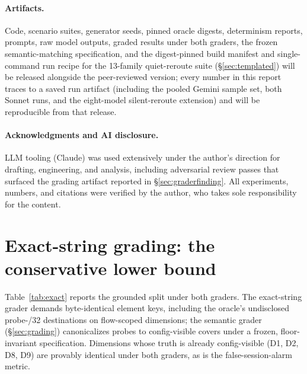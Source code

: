 \documentclass[11pt]{article}
\begin{document}
\paragraph{Artifacts.} Code, scenario suites, generator seeds, pinned
oracle digests, determinism reports, prompts, raw model outputs, graded
results under both graders, the frozen semantic-matching specification, and
the digest-pinned build manifest and single-command run recipe for the
13-family quiet-reroute suite (\S\ref{sec:templated})
will be released alongside the peer-reviewed version; every number in this
report traces to a saved run artifact (including the pooled Gemini sample
set, both Sonnet runs, and the eight-model silent-reroute extension) and will
be reproducible from that release.

\paragraph{Acknowledgments and AI disclosure.} LLM tooling (Claude) was
used extensively under the author's direction for drafting, engineering,
and analysis, including adversarial review passes that surfaced the grading
artifact reported in \S\ref{sec:graderfinding}. All experiments, numbers,
and citations were verified by the author, who takes sole responsibility
for the content.

\appendix

\section{Exact-string grading: the conservative lower bound}
\label{app:exact}

Table~\ref{tab:exact} reports the grounded split under both graders. The
exact-string grader demands byte-identical element keys, including the
oracle's undisclosed probe-/32 destinations on flow-scoped dimensions; the
semantic grader (\S\ref{sec:grading}) canonicalizes probes to
config-visible covers under a frozen, floor-invariant specification.
Dimensions whose truth is already config-visible (D1, D2, D8, D9) are
provably identical under both graders, as is the false-session-alarm
metric.
\end{document}
